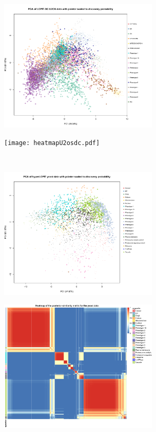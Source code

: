 \documentclass[12pt,english]{article}
\begin{document}
\begin{figure}
	\begin{subfigure}[t]{0.5\textwidth}
	\centering
	\includegraphics[height=2.5in]{pcau2osdc.pdf}
	\caption{}
\end{subfigure}
\begin{subfigure}[t]{0.5\textwidth}
	\centering
	\texttt{[image: heatmapU2osdc.pdf]}
	\caption{}
\end{subfigure}
~
\begin{subfigure}[t]{0.5\textwidth}
	\centering
	\includegraphics[height=2.5in]{pcaYeast.pdf}
	\caption{}
\end{subfigure}
\begin{subfigure}[t]{0.5\textwidth}
	\centering
	\includegraphics[height=2.5in]{heatmapYeast.pdf}

\end{subfigure}
\end{figure}
\end{document}
